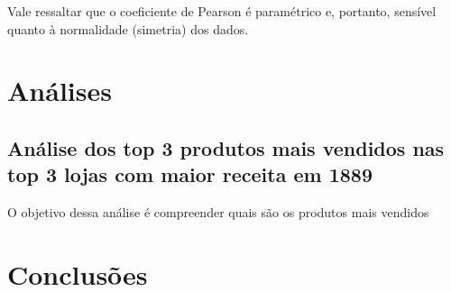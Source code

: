 \documentclass[
]{estat/estat}
\let\oldsection\section
\renewcommand\section{\clearpage\oldsection}
\begin{document}
Vale ressaltar que o coeficiente de Pearson é paramétrico e, portanto,
sensível quanto à normalidade (simetria) dos dados.

\section{Análises}\label{anuxe1lises}

\subsection{Análise dos top 3 produtos mais vendidos nas top 3 lojas com
maior receita em
1889}\label{anuxe1lise-dos-top-3-produtos-mais-vendidos-nas-top-3-lojas-com-maior-receita-em-1889}

O objetivo dessa análise é compreender quais são os produtos mais
vendidos

\section{Conclusões}\label{conclusuxf5es}
\end{document}
